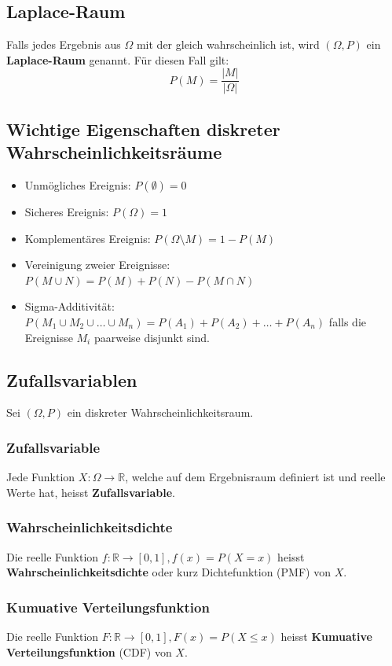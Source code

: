 \subsection{Laplace-Raum}
\label{sec:laplace-raum}
Falls jedes Ergebnis aus $\Omega$ mit der gleich wahrscheinlich ist, wird $(\Omega ,P)$ ein \textbf{Laplace-Raum} genannt. Für diesen Fall gilt:
\begin{equation*}
    P(M) = \frac{|M|}{|\Omega|}
\end{equation*}
\subsection{Wichtige Eigenschaften diskreter Wahrscheinlichkeitsräume}
\label{sec:wichtige-eigenschaften-diskreter-wahrscheinlichkeitsrume}
\begin{itemize}
    \item Unmögliches Ereignis: $P(\emptyset) = 0$
    \item Sicheres Ereignis: $P(\Omega) = 1$
    \item Komplementäres Ereignis: $P(\Omega \setminus M) = 1 - P(M)$
    \item Vereinigung zweier Ereignisse: $P(M \cup N) = P(M) + P(N) - P(M \cap N)$
    \item Sigma-Additivität: $P(M_1 \cup M_2 \cup \dots \cup M_n) = P(A_1) + P(A_2) + \dots + P(A_n)$
        falls die Ereignisse $M_i$ paarweise disjunkt sind.
\end{itemize}
\subsection{Zufallsvariablen}
\label{sec:zufallsvariablen}
Sei $(\Omega ,P)$ ein diskreter Wahrscheinlichkeitsraum.
\subsubsection{Zufallsvariable}
\label{sec:zufallsvariable}
Jede Funktion $X:\Omega \rightarrow \mathbb{R}$, welche auf dem Ergebnisraum definiert ist und reelle Werte hat, heisst \textbf{Zufallsvariable}.
\subsubsection{Wahrscheinlichkeitsdichte}
\label{sec:wahrscheinlichkeitsdichte}
Die reelle Funktion $f:\mathbb{R} \rightarrow [0,1], f(x) = P(X = x)$ heisst \textbf{Wahrscheinlichkeitsdichte} oder kurz Dichtefunktion (PMF) von $X$.
\subsubsection{Kumuative Verteilungsfunktion}
\label{sec:kumuative-verteilungsfunktion}
Die reelle Funktion $F:\mathbb{R} \rightarrow [0,1], F(x) = P(X \leq x)$ heisst \textbf{Kumuative Verteilungsfunktion} (CDF) von $X$.

